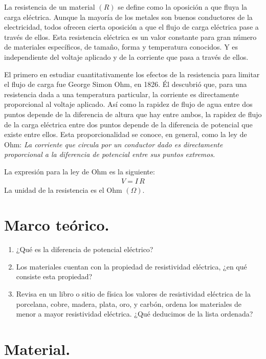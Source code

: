 \documentclass[14pt]{extarticle}
\begin{document}
La resistencia de un material $(R)$ se define como la oposición a que fluya la carga eléctrica. Aunque la mayoría de los metales son buenos conductores de la electricidad, todos ofrecen cierta oposición a que el flujo de carga eléctrica pase a través de ellos. Esta resistencia eléctrica es un valor constante para gran número de materiales específicos, de tamaño, forma y temperatura conocidos. Y es independiente del voltaje aplicado y de la corriente que pasa a través de ellos.
\par
El primero en estudiar cuantitativamente los efectos de la resistencia para limitar el flujo de carga fue George Simon Ohm, en 1826. Él descubrió que, para una resistencia dada a una temperatura particular, la corriente es directamente proporcional al voltaje aplicado. Así como la rapidez de flujo de agua entre dos puntos depende de la diferencia de altura que hay entre ambos, la rapidez de flujo de la carga eléctrica entre dos puntos depende de la diferencia de potencial que existe entre ellos. Esta proporcionalidad se conoce, en general, como la ley de Ohm:
\textit{La corriente que circula por un conductor dado es directamente proporcional a la diferencia de potencial entre sus puntos extremos}.
\par
La expresión para la ley de Ohm es la siguiente:
\begin{align*}
V = I \, R
\end{align*}
La unidad de la resistencia es el Ohm $(\Omega)$.

\section{Marco teórico.}

\begin{enumerate}[label=\alph*)]
\item ¿Qué es la diferencia de potencial eléctrico?
\item Los materiales cuentan con la propiedad de resistividad eléctrica, ¿en qué consiste esta propiedad?
\item Revisa en un libro o sitio de física los valores de resistividad eléctrica de la porcelana, cobre, madera, plata, oro, y carbón, ordena los materiales de menor a mayor resistividad eléctrica. ¿Qué deducimos de la lista ordenada?
\end{enumerate}

\section{Material.}
\end{document}
